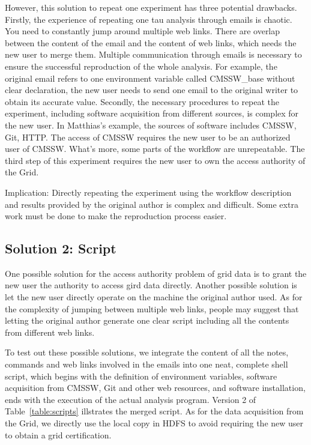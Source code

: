 \documentclass{acm_proc_article-sp}
\begin{document}
However, this solution to repeat one experiment has three potential drawbacks.
Firstly, the experience of repeating one tau analysis through emails is
chaotic. You need to constantly jump around multiple web links. There are overlap
between the content of the email and the content of web links, which needs the
new user to merge them. Multiple communication through emails is necessary to
ensure the successful reproduction of the whole analysis. For example, the original
email refers to one environment variable called CMSSW\_base without clear
declaration, the new user needs to send one email to the original writer to
obtain its accurate value. Secondly, the necessary procedures to repeat the
experiment, including software acquisition from different sources, is complex
for the new user. In Matthias's example, the sources of software includes
CMSSW, Git, HTTP. The access of CMSSW requires the new user to be an authorized
user of CMSSW. What's more, some parts of the workflow are unrepeatable. The
third step of this experiment requires the new user to own the access authority
of the Grid. 

Implication: Directly repeating the experiment using the workflow description and results provided by the original author is complex and difficult. Some extra work must be done to make the reproduction process easier.

\subsection{Solution 2: Script}
One possible solution for the access authority problem of grid data is to grant the new user the authority to access gird data directly. Another possible solution is let the new user directly operate on the machine the original author used. As for the complexity of jumping between multiple web links, people may suggest that letting the original author generate one clear script including all the contents from different web links.

To test out these possible solutions, we integrate the content of all the notes, commands and web links involved in the emails into one neat, complete shell script, which begins with the definition of environment variables, software acquisition from CMSSW, Git and other web resources, and software installation, ends with the execution of the actual analysis program. Version 2 of Table~\ref{table:scripts} illstrates the merged script. As for the data acquisition from the Grid, we directly use the local copy in HDFS to avoid requiring the new user to obtain a grid certification.
\end{document}
